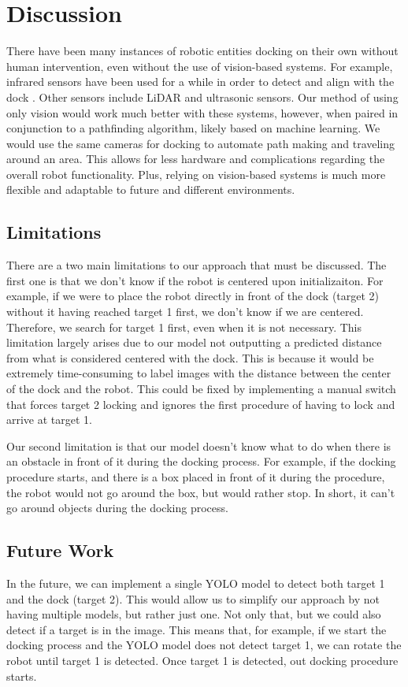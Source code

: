 \section{Discussion}
There have been many instances of robotic entities docking on their own without human intervention, even without the use of vision-based systems. For example, infrared sensors have been used for a while in order to detect and align with the dock \citep{quilez:hal-01147332}. Other sensors include LiDAR and ultrasonic sensors. Our method of using only vision would work much better with these systems, however, when paired in conjunction to a pathfinding algorithm, likely based on machine learning. We would use the same cameras for docking to automate path making and traveling around an area. This allows for less hardware and complications regarding the overall robot functionality. Plus, relying on vision-based systems is much more flexible and adaptable to future and different environments.
\subsection{Limitations}
There are a two main limitations to our approach that must be discussed. The first one is that we don't know if the robot is centered upon initializaiton. For example, if we were to place the robot directly in front of the dock (target 2) without it having reached target 1 first, we don't know if we are centered. Therefore, we search for target 1 first, even when it is not necessary. This limitation largely arises due to our model not outputting a predicted distance from what is considered centered with the dock. This is because it would be extremely time-consuming to label images with the distance between the center of the dock and the robot. This could be fixed by implementing a manual switch that forces target 2 locking and ignores the first procedure of having to lock and arrive at target 1.

Our second limitation is that our model doesn't know what to do when there is an obstacle in front of it during the docking process. For example, if the docking procedure starts, and there is a box placed in front of it during the procedure, the robot would not go around the box, but would rather stop. In short, it can't go around objects during the docking process.

\subsection{Future Work}
In the future, we can implement a single YOLO model to detect both target 1 and the dock (target 2). This would allow us to simplify our approach by not having multiple models, but rather just one. Not only that, but we could also detect if a target is in the image. This means that, for example, if we start the docking process and the YOLO model does not detect target 1, we can rotate the robot until target 1 is detected. Once target 1 is detected, out docking procedure starts.
